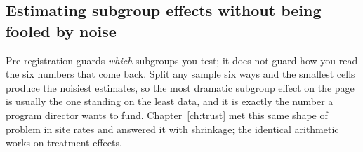 \documentclass[
    a4paper,
    fontsize=10pt,
    twoside=true,
    numbers=noenddot,
]{kaobook}
\begin{document}
\subsection{Estimating subgroup effects without being fooled by noise}\label{ch08-sc-shrinkfx}
Pre-registration guards \emph{which} subgroups you test; it does not guard how you read the six numbers that come back. Split any sample six ways and the smallest cells produce the noisiest estimates, so the most dramatic subgroup effect on the page is usually the one standing on the least data, and it is exactly the number a program director wants to fund. Chapter~\ref{ch:trust} met this same shape of problem in site rates and answered it with shrinkage; the identical arithmetic works on treatment effects.
\end{document}
